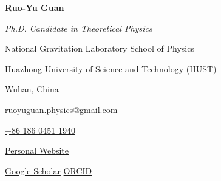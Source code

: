 \documentclass[letterpaper,11pt]{article}
\begin{document}
\thispagestyle{fancy}


{\centering
    {\LARGE\bfseries Ruo-Yu Guan\par}
}

\vspace{7pt}

\noindent
\begin{minipage}[t]{0.65\textwidth}
    \vspace{0pt}
    \small

    \textit{Ph.D. Candidate in Theoretical Physics}
    \par\vspace{2pt}

    National Gravitation Laboratory
    \enspace\textbar\enspace
    School of Physics
    \par\vspace{2pt}

    Huazhong University of Science and Technology (HUST)
    \par\vspace{2pt}

    Wuhan, China\par

\end{minipage}%
\hfill
\begin{minipage}[t]{0.34\textwidth}
    \vspace{0pt}
    \raggedleft
    \small

    \href{mailto:ruoyuguan.physics@gmail.com}
    {ruoyuguan.physics@gmail.com}
    \par\vspace{2pt}

    \href{tel:+8618604511940}
    {+86 186 0451 1940}
    \par\vspace{2pt}

    \href{https://ruoyuguan.github.io/}
    {Personal Website}
    \par\vspace{2pt}

    \href{https://scholar.google.com/citations?user=krWheg0AAAAJ}
    {Google Scholar}
    \enspace\textbar\enspace
    \href{https://orcid.org/0009-0000-8680-1762}
    {ORCID}\par

\end{minipage}
\end{document}
